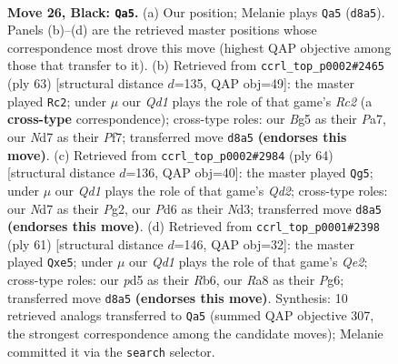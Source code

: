\documentclass[11pt]{article}
\begin{document}
\clearpage

\begin{figure}[p]\centering
\begin{subfigure}{0.46\textwidth}\centering
\resizebox{\linewidth}{!}{%
\newchessgame
\chessboard[
  setfen={rn1qr3/pR1n1pkP/3p4/3P2b1/4P1P1/2NQ4/4N3/4K2R b K - 1 26},
  showmover=false,
  pgfstyle=straightmove, color=movearrow, markmove={d8-a5}
]}
\caption{}
\end{subfigure}\hfill
\begin{subfigure}{0.46\textwidth}\centering
\resizebox{\linewidth}{!}{%
\newchessgame
\chessboard[
  setfen={6k1/ppr1rpn1/6p1/3pPPRn/q2P4/3Q1N2/1P2NK2/7R b - - 0 32},
  showmover=false,
  pgfstyle=straightmove, color=movearrow, markmove={c7-c2}
]}
\caption{}
\end{subfigure}
\\[4pt]
\begin{subfigure}{0.46\textwidth}\centering
\resizebox{\linewidth}{!}{%
\newchessgame
\chessboard[
  setfen={5nk1/4r1p1/2p5/2Nqp3/1P1n3p/3N3P/3Q2P1/4R2K w - - 0 33},
  showmover=false,
  pgfstyle=straightmove, color=movearrow, markmove={d2-g5}
]}
\caption{}
\end{subfigure}\hfill
\begin{subfigure}{0.46\textwidth}\centering
\resizebox{\linewidth}{!}{%
\newchessgame
\chessboard[
  setfen={8/p1r1qp1k/1rP2np1/4P3/3N4/P1Q1P2P/4B1P1/2R3K1 b - - 0 31},
  showmover=false,
  pgfstyle=straightmove, color=movearrow, markmove={e7-e5}
]}
\caption{}
\end{subfigure}
\caption{\textbf{Move 26, Black: \texttt{Qa5}.} (a) Our position; Melanie plays \texttt{Qa5} (\texttt{d8a5}). Panels (b)--(d) are the retrieved master positions whose correspondence most drove this move (highest QAP objective among those that transfer to it). (b) Retrieved from \texttt{ccrl\_top\_p0002\#2465} (ply 63) [structural distance $d$=135, QAP obj=49]: the master played \texttt{Rc2}; under $\mu$ our \emph{Qd1} plays the role of that game's \emph{Rc2} (a \textbf{cross-type} correspondence); cross-type roles: our \emph{B}g5 as their \emph{P}a7, our \emph{N}d7 as their \emph{P}f7; transferred move \texttt{d8a5} \textbf{(endorses this move)}. (c) Retrieved from \texttt{ccrl\_top\_p0002\#2984} (ply 64) [structural distance $d$=136, QAP obj=40]: the master played \texttt{Qg5}; under $\mu$ our \emph{Qd1} plays the role of that game's \emph{Qd2}; cross-type roles: our \emph{N}d7 as their \emph{P}g2, our \emph{P}d6 as their \emph{N}d3; transferred move \texttt{d8a5} \textbf{(endorses this move)}. (d) Retrieved from \texttt{ccrl\_top\_p0001\#2398} (ply 61) [structural distance $d$=146, QAP obj=32]: the master played \texttt{Qxe5}; under $\mu$ our \emph{Qd1} plays the role of that game's \emph{Qe2}; cross-type roles: our \emph{p}d5 as their \emph{R}b6, our \emph{R}a8 as their \emph{P}g6; transferred move \texttt{d8a5} \textbf{(endorses this move)}. Synthesis: 10 retrieved analogs transferred to \texttt{Qa5} (summed QAP objective 307, the strongest correspondence among the candidate moves); Melanie committed it via the \texttt{search} selector.}
\label{fig:thought-m51}
\end{figure}
\end{document}
